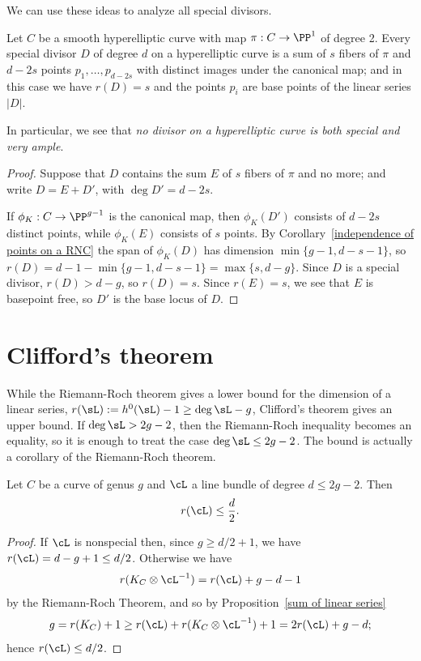 We can use these ideas to analyze all special divisors.

\begin{corollary}\label{special on hyperelliptic} Let $C$ be a smooth hyperelliptic curve with map $\pi: C\to \PP^1$ of degree 2.
Every special divisor $D$ of degree $d$ on a hyperelliptic curve is a sum of $s$ fibers of $\pi$ and $d-2s$ points $p_1,\dots,p_{d-2s}$ with distinct images under the canonical map; and in this case we have $r(D) = s$ and the points $p_i$ are base points of the linear series $|D|$.
\end{corollary}

In particular, we see that \emph{no divisor on a hyperelliptic curve is both special and very ample}.

\begin{proof}
Suppose that $D$ contains the sum $E$ of $s$ fibers of $\pi$ and no more; and write $D = E+D'$, with $\deg D' = d-2s$.
 
If $\phi_K:C \to \PP^{g-1}$ is the canonical map, then $\phi_K(D')$ consists of $d-2s$ distinct points, while $\phi_K(E)$ consists of
$s$ points. By Corollary~\ref{independence of points on a RNC} the span of $\phi_K(D)$ has dimension $\min\{g-1, d-s-1\}$, so 
$r(D) = d-1-\min\{g-1, d-s-1\} = \max \{s,d-g\}$. Since $D$ is a special divisor, $r(D) > d-g$, so $r(D) = s$. 
Since $r(E) =s$, we see that $E$ is basepoint free, so $D'$ is the base locus of $D$.
\end{proof}

\section{Clifford's theorem}\label{Clifford Section}

While the Riemann-Roch theorem gives a lower bound for the dimension of a linear series, $r(\sL) := h^0(\sL)-1 \geq \deg \sL -g$, Clifford's theorem
gives an upper bound. If $\deg \sL>2g-2$, then the Riemann-Roch inequality becomes an equality, so it is enough to treat the case $\deg \sL \leq 2g-2$. The bound is actually a corollary of the Riemann-Roch theorem.

\begin{corollary}\label{Clifford bound}
 Let $C$ be a curve of genus $g$ and $\cL$ a line bundle of degree $d \leq 2g-2$. Then
$$
r(\cL) \leq \frac{d}{2}.
$$
\end{corollary}

\begin{proof}
If $\cL$ is nonspecial then, since $g\geq d/2 + 1$, we have $r(\cL) = d-g+1\leq d/2$.
Otherwise we have
$$
r(K_C\otimes \cL^{-1}) = r(\cL) +g - d - 1
$$
by the Riemann-Roch Theorem,
and so by Proposition~\ref{sum of linear series}
$$
g = r(K_C)+1  \geq r(\cL) + r(K_C\otimes \cL^{-1}) +1  = 2r(\cL) +g - d;
$$
hence $r(\cL) \leq d/2$.
\end{proof}

